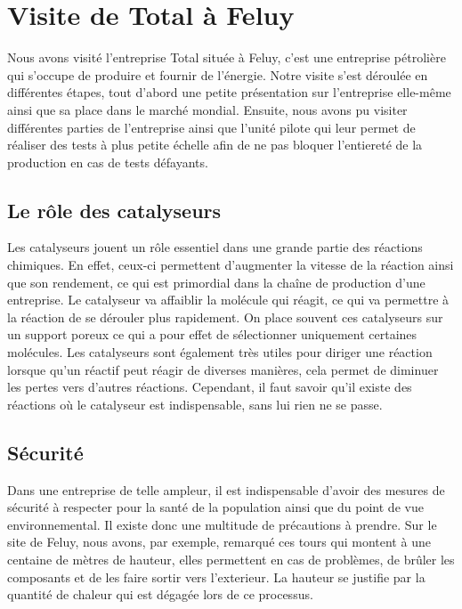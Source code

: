\documentclass[10pt,a4paper]{article}
\begin{document}
\section{Visite de Total à Feluy}

Nous avons visité l'entreprise Total située à Feluy, c'est une entreprise pétrolière qui s'occupe de produire et fournir de l'énergie. Notre visite s'est déroulée en différentes étapes, tout d'abord une petite présentation sur l'entreprise elle-même ainsi que sa place dans le marché mondial. Ensuite, nous avons pu visiter différentes parties de l'entreprise ainsi que l'unité pilote qui leur permet de réaliser des tests à plus petite échelle afin de ne pas bloquer l'entiereté de la production en cas de tests défayants.

\subsection{Le rôle des catalyseurs}

Les catalyseurs jouent un rôle essentiel dans une grande partie des réactions chimiques. En effet, ceux-ci permettent d'augmenter la vitesse de la réaction ainsi que son rendement, ce qui est primordial dans la chaîne de production d'une entreprise. Le catalyseur va affaiblir la molécule qui réagit, ce qui va permettre à la réaction de se dérouler plus rapidement.
On place souvent ces catalyseurs sur un support poreux ce qui a pour effet de sélectionner uniquement certaines molécules. Les catalyseurs sont également très utiles pour diriger une réaction lorsque qu'un réactif peut réagir de diverses manières, cela permet de diminuer les pertes vers d'autres réactions. Cependant, il faut savoir qu'il existe des réactions où le catalyseur est indispensable, sans lui rien ne se passe.

\subsection{Sécurité}

Dans une entreprise de telle ampleur, il est indispensable d'avoir des mesures de sécurité à respecter pour la santé de la population ainsi que du point de vue environnemental. Il existe donc une multitude de précautions à prendre. Sur le site de Feluy, nous avons, par exemple, remarqué ces tours qui montent à une centaine de mètres de hauteur, elles permettent en cas de problèmes, de brûler les composants et de les faire sortir vers l'exterieur. La hauteur se justifie par la quantité de chaleur qui est dégagée lors de ce processus.
\end{document}
